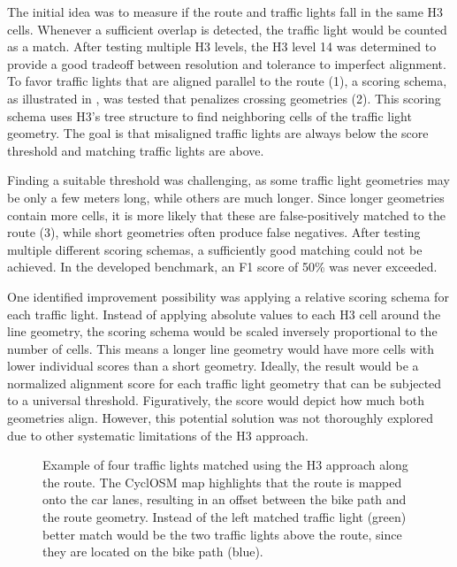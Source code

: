 The initial idea was to measure if the route and traffic lights fall in the same H3 cells. Whenever a sufficient overlap is detected, the traffic light would be counted as a match. After testing multiple H3 levels, the H3 level 14 was determined to provide a good tradeoff between resolution and tolerance to imperfect alignment. To favor traffic lights that are aligned parallel to the route (1), a scoring schema, as illustrated in , was tested that penalizes crossing geometries (2). This scoring schema uses H3's tree structure to find neighboring cells of the traffic light geometry. The goal is that misaligned traffic lights are always below the score threshold and matching traffic lights are above.

Finding a suitable threshold was challenging, as some traffic light geometries may be only a few meters long, while others are much longer. Since longer geometries contain more cells, it is more likely that these are false-positively matched to the route (3), while short geometries often produce false negatives. After testing multiple different scoring schemas, a sufficiently good matching could not be achieved. In the developed benchmark, an F1 score of 50\% was never exceeded. 

One identified improvement possibility was applying a relative scoring schema for each traffic light. Instead of applying absolute values to each H3 cell around the line geometry, the scoring schema would be scaled inversely proportional to the number of cells. This means a longer line geometry would have more cells with lower individual scores than a short geometry. Ideally, the result would be a normalized alignment score for each traffic light geometry that can be subjected to a universal threshold. Figuratively, the score would depict how much both geometries align. However, this potential solution was not thoroughly explored due to other systematic limitations of the H3 approach.

\begin{figure}[t]
\centering
{}
\caption{Example of four traffic lights matched using the H3 approach along the route. The CyclOSM map highlights that the route is mapped onto the car lanes, resulting in an offset between the bike path and the route geometry. Instead of the left matched traffic light (green) better match would be the two traffic lights above the route, since they are located on the bike path (blue).}
\label{fig:sg-selection-h3-example}
\end{figure}

